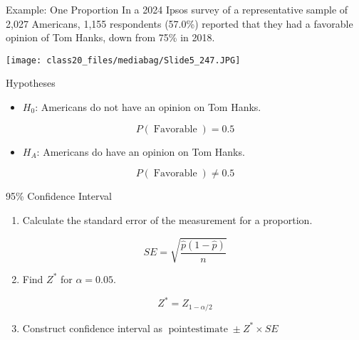 \documentclass[
  ignorenonframetext,
]{beamer}
\providecommand{\tightlist}{%
  \setlength{\itemsep}{0pt}\setlength{\parskip}{0pt}}\usepackage{longtable,booktabs,array}
\begin{document}
\begin{frame}{Example: One Proportion}
\label{example-one-proportion}
In a 2024 Ipsos survey of a representative sample of 2,027 Americans,
1,155 respondents (57.0\%) reported that they had a favorable opinion of
Tom Hanks, down from 75\% in 2018. \begin{center}
\texttt{[image: class20\_files/mediabag/Slide5\_247.JPG]}
\end{center}
\end{frame}

\begin{frame}{Hypotheses}
\label{hypotheses}
\pause

\begin{itemize}
\tightlist
\item
  \(H_0\): Americans do not have an opinion on Tom Hanks.
\end{itemize}

\pause

\[P(\operatorname{Favorable}) = 0.5\]

\pause

\begin{itemize}
\tightlist
\item
  \(H_A\): Americans do have an opinion on Tom Hanks.
\end{itemize}

\pause

\[P(\operatorname{Favorable}) \ne 0.5\]
\end{frame}

\begin{frame}{95\% Confidence Interval}
\label{confidence-interval}
\pause

\begin{enumerate}
\tightlist
\item
  Calculate the standard error of the measurement for a proportion.
\end{enumerate}

\[
SE=\sqrt{\frac{\hat{p}(1-\hat{p})}{n}}
\]

\pause

\begin{enumerate}
\setcounter{enumi}{1}
\tightlist
\item
  Find \(Z^*\) for \(\alpha = 0.05\).
\end{enumerate}

\[
Z^*=Z_{1-\alpha/2}
\]

\pause

\begin{enumerate}
\setcounter{enumi}{2}
\tightlist
\item
  Construct confidence interval as
  \(\operatorname{point estimate} \pm Z^* \times SE\)
\end{enumerate}
\end{frame}
\end{document}
